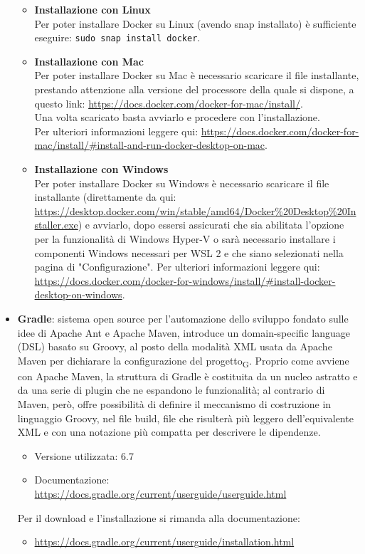 \begin{itemize}
	\begin{itemize}
	\item \textbf{Installazione con Linux}\\
	Per poter installare Docker su Linux (avendo snap installato) è sufficiente eseguire: \texttt{sudo snap install docker}.

	\item \textbf{Installazione con Mac}\\Per poter installare Docker su Mac è necessario scaricare il file installante, prestando attenzione alla versione del processore della quale si dispone, a questo link: \url{https://docs.docker.com/docker-for-mac/install/}.
	\\Una volta scaricato basta avviarlo e procedere con l'installazione. \\Per ulteriori informazioni leggere qui: \url{https://docs.docker.com/docker-for-mac/install/#install-and-run-docker-desktop-on-mac}.

	\item \textbf{Installazione con Windows}\\
		Per poter installare Docker su Windows è necessario scaricare il file installante (direttamente da qui: \url{https://desktop.docker.com/win/stable/amd64/Docker\%20Desktop\%20Installer.exe}) e avviarlo, dopo essersi assicurati che sia abilitata l'opzione per la funzionalità di Windows Hyper-V o sarà necessario installare i componenti Windows necessari per WSL 2 e che siano selezionati nella pagina di "Configurazione". Per ulteriori informazioni leggere qui: \url{https://docs.docker.com/docker-for-windows/install/#install-docker-desktop-on-windows}.
	\end{itemize}


	\item \textbf{Gradle}: sistema open source per l'automazione dello sviluppo fondato sulle idee di Apache Ant e Apache Maven, introduce un domain-specific language (DSL) basato su Groovy, al posto della modalità XML usata da Apache Maven per dichiarare la configurazione del progetto\textsubscript{G}. Proprio come avviene con Apache Maven, la struttura di Gradle è costituita da un nucleo astratto e da una serie di plugin che ne espandono le funzionalità; al contrario di Maven, però, offre possibilità di definire il meccanismo di costruzione in linguaggio Groovy, nel file build, file che risulterà più leggero dell'equivalente XML e con una notazione più compatta per descrivere le dipendenze.
	\begin{itemize}
		\item Versione utilizzata: 6.7
		\item Documentazione: \url{https://docs.gradle.org/current/userguide/userguide.html}
	\end{itemize}
	Per il download e l'installazione si rimanda alla documentazione:
	\begin{itemize}
		\item \url{https://docs.gradle.org/current/userguide/installation.html}
	\end{itemize}

\end{itemize}

